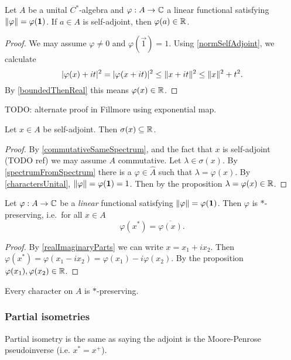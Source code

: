 \begin{proposition}
Let $A$ be a unital $C^*$-algebra and $\varphi: A\to \mathbb{C}$ a linear functional satisfying $\lVert\varphi\rVert = \varphi(\boldsymbol{\mathrm{1}})$. If $a\in A$ is self-adjoint, then $\varphi(a) \in \mathbb{R}$.
\end{proposition}
\begin{proof}
We may assume $\varphi \neq 0$ and $\varphi(\vec{1}) = 1$. Using \ref{normSelfAdjoint}, we calculate
\[ |\varphi(x)+it|^2 = |\varphi(x+it)|^2 \leq \lVert x+it\rVert^2 \leq \lVert x\rVert^2 + t^2. \]
By \ref{boundedThenReal} this means $\varphi(x)\in\mathbb{R}$.
\end{proof}
TODO: alternate proof in Fillmore using exponential map.
\begin{corollary} \label{selfAdjointSpectrumReal}
Let $x\in A$ be self-adjoint. Then $\sigma(x) \subseteq \mathbb{R}$.
\end{corollary}
\begin{proof}
By \ref{commutativeSameSpectrum}, and the fact that $x$ is self-adjoint (TODO ref) we may assume $A$ commutative. Let $\lambda \in \sigma(x)$. By \ref{spectrumFromSpectrum} there is a $\varphi\in\hat{A}$ such that $\lambda = \varphi(x)$. By \ref{charactersUnital}, $\lVert\varphi\rVert = \varphi(\boldsymbol{\mathrm{1}}) = 1$. Then by the proposition $\lambda = \varphi(x) \in \mathbb{R}$.
\end{proof}
\begin{corollary}
Let $\varphi:A\to \mathbb{C}$ be a \emph{linear} functional satisfying $\lVert\varphi\rVert = \varphi(\boldsymbol{\mathrm{1}})$. Then $\varphi$ is $*$-preserving, i.e.\ for all $x\in A$
\[\varphi(x^*) = \overline{\varphi(x)}. \] 
\end{corollary}
\begin{proof}
By \ref{realImaginaryParts} we can write $x= x_1+ix_2$. Then $\varphi(x^*) = \varphi(x_1-ix_2) = \varphi(x_1) - i \varphi(x_2)$. By the proposition $\varphi(x_1), \varphi(x_2)\in \mathbb{R}$.
\end{proof}
\begin{corollary} \label{characters*Preserving}
Every character on $A$ is $*$-preserving.
\end{corollary}


\subsubsection{Partial isometries}
Partial isometry is the same as saying the adjoint is the Moore-Penrose pseudoinverse (i.e. $x^* = x^+$).

